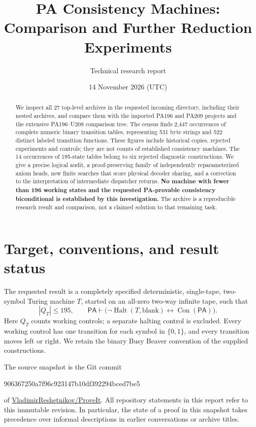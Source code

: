 \documentclass[10pt,letterpaper]{article}
\title{\color{ink}PA Consistency Machines:\\Comparison and Further Reduction Experiments}
\author{Technical research report}
\date{14 November 2026 (UTC)}
\newcommand{\PA}{\mathsf{PA}}
\newcommand{\Con}{\operatorname{Con}}
\newcommand{\Halt}{\operatorname{Halt}}
\newcommand{\repo}{https://github.com/VladimirReshetnikov/ProveIt}
\newcommand{\pin}{906367250a7f96c923147b10df392294bced7be5}
\begin{document}
\maketitle
\begin{abstract}
We inspect all 27 top-level archives in the requested incoming directory,
including their nested archives, and compare them with the imported PA196 and
PA209 projects and the extensive PA196--U208 comparison tree. The census finds
2,447 occurrences of complete numeric binary transition tables, representing
531 byte strings and 522 distinct labeled transition functions. These figures
include historical copies, rejected experiments and controls; they are not
counts of established consistency machines. The 14 occurrences of 195-state
tables belong to six rejected diagnostic constructions. We give a precise
logical audit, a proof-preserving family of independently reparameterized axiom
heads, new finite searches that score physical decoder sharing, and a correction
to the interpretation of intermediate dispatcher returns. \textbf{No machine
with fewer than 196 working states and the requested PA-provable consistency
biconditional is established by this investigation.} The archive is a reproducible
research result and comparison, not a claimed solution to that remaining task.
\end{abstract}

\section{Target, conventions, and result status}

The requested result is a completely specified deterministic, single-tape,
two-symbol Turing machine $T$, started on an all-zero two-way infinite tape,
such that
\begin{equation}\label{eq:target}
 |Q_T|\leq195,
 \qquad
 \PA\vdash\bigl(\neg\Halt(T,\mathrm{blank})\leftrightarrow\Con(\PA)\bigr).
\end{equation}
Here $Q_T$ counts working controls; a separate halting control is excluded.
Every working control has one transition for each symbol in $\{0,1\}$, and
every transition moves left or right. We retain the binary Busy Beaver
convention of the supplied constructions.

The source snapshot is the Git commit
\begin{center}\small\ttfamily\pin\end{center}
of \href{\repo}{VladimirReshetnikov/ProveIt}. All repository statements in
this report refer to this immutable revision. In particular, the state of a
proof in this snapshot takes precedence over informal descriptions in earlier
conversations or archive titles.
\end{document}
